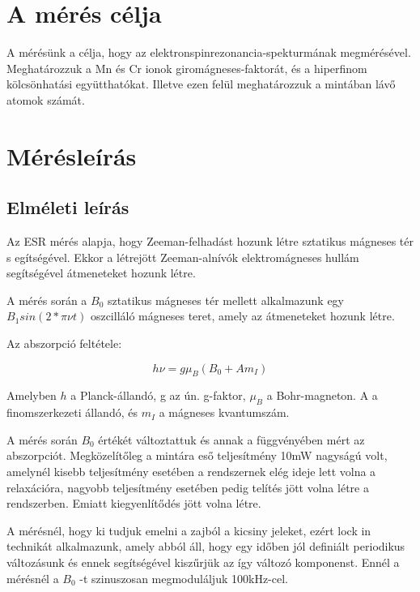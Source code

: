 \documentclass[a4paper,12pt]{article}
\begin{document}
\newpage

\section{A mérés célja}

A mérésünk a célja, hogy az elektronspinrezonancia-spekturmának megmérésével. Meghatározzuk a Mn és Cr ionok giromágneses-faktorát, és a hiperfinom kölcsönhatási együtthatókat. Illetve ezen felül meghatározzuk a mintában lávő atomok számát. 

\section{Mérésleírás}

\subsection{Elméleti leírás}

Az ESR mérés alapja, hogy Zeeman-felhadást hozunk létre sztatikus mágneses tér s
egítségével. Ekkor a létrejött Zeeman-alnívók elektromágneses hullám segítségével  átmeneteket hozunk létre.

A mérés során a $B_0$ sztatikus mágneses tér mellett alkalmazunk egy$ B_1 sin(2*\pi \nu t)$ oszcilláló mágneses teret, amely az átmeneteket hozunk létre. 

Az abszorpció feltétele:

\begin{equation}
h \nu = g \mu_{B}(B_0 + A m_I)
\end{equation}

Amelyben $h$ a Planck-állandó, g az ún. g-faktor, $\mu_B$ a Bohr-magneton. A a finomszerkezeti állandó, és $m_I$ a mágneses kvantumszám. 

A mérés során $B_0$ értékét változtattuk és annak a függvényében mért az abszorpciót. Megközelítőleg a mintára eső teljesítmény 10mW nagyságú volt, amelynél kisebb teljesítmény esetében a rendszernek elég ideje lett volna a relaxációra, nagyobb teljesítmény esetében pedig telítés jött volna létre a rendszerben. Emiatt kiegyenlítődés jött volna létre.

A mérésnél, hogy ki tudjuk emelni a zajból a kicsiny jeleket, ezért lock in technikát alkalmazunk, amely abból áll, hogy egy időben jól definiált periodikus változásunk és ennek segítségével kiszűrjük az így változó komponenst. Ennél a mérésnél a $B_0$ -t szinuszosan megmoduláljuk 100kHz-cel. 
\end{document}
